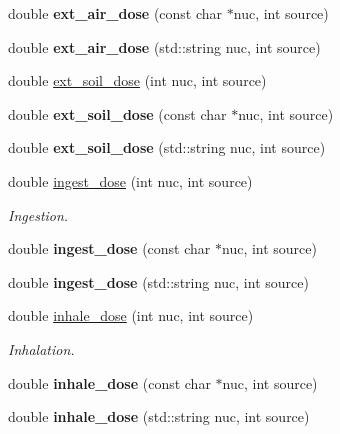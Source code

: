 \begin{DoxyCompactItemize}
double {\bfseries ext\+\_\+air\+\_\+dose} (const char $\ast$nuc, int source)
\item 
\mbox{\label{namespacepyne_a09b2b4735e133e9e4dbf7bc4747634e4}} 
double {\bfseries ext\+\_\+air\+\_\+dose} (std\+::string nuc, int source)
\item 
double \hyperlink{namespacepyne_a09838b0682aec7c3b6b5d79ab95ed743}{ext\+\_\+soil\+\_\+dose} (int nuc, int source)
\item 
\mbox{\label{namespacepyne_a9867f11c3b7e789debe84e2ff01d1ec3}} 
double {\bfseries ext\+\_\+soil\+\_\+dose} (const char $\ast$nuc, int source)
\item 
\mbox{\label{namespacepyne_ab93a398d022c1356b6d1604ce1235cf3}} 
double {\bfseries ext\+\_\+soil\+\_\+dose} (std\+::string nuc, int source)
\item 
double \hyperlink{namespacepyne_a887bcaf7058c4b8aba27ba942fe7819a}{ingest\+\_\+dose} (int nuc, int source)
\begin{DoxyCompactList}\small\item\em Ingestion. \end{DoxyCompactList}\item 
\mbox{\label{namespacepyne_a9531d11f025d049ca7c44ba15ea4c94c}} 
double {\bfseries ingest\+\_\+dose} (const char $\ast$nuc, int source)
\item 
\mbox{\label{namespacepyne_ad7515a09e37864e74599a14b18d76598}} 
double {\bfseries ingest\+\_\+dose} (std\+::string nuc, int source)
\item 
double \hyperlink{namespacepyne_ab1b598dc77d5c5f0c33f4d3d6d14a454}{inhale\+\_\+dose} (int nuc, int source)
\begin{DoxyCompactList}\small\item\em Inhalation. \end{DoxyCompactList}\item 
\mbox{\label{namespacepyne_a3dd875f3600663760bc0b85276ccc599}} 
double {\bfseries inhale\+\_\+dose} (const char $\ast$nuc, int source)
\item 
\mbox{\label{namespacepyne_a5c1b2d84762f22e82b5bf1a635355f8a}} 
double {\bfseries inhale\+\_\+dose} (std\+::string nuc, int source)

\end{DoxyCompactItemize}
